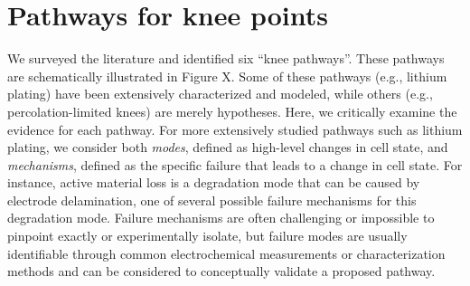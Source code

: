 \documentclass[journal=jpcl, manuscript=article, layout=onecolumn]{achemso}
\begin{document}
    
    




\section{Pathways for knee points}

We surveyed the literature and identified six ``knee pathways''. These pathways are schematically illustrated in Figure X. Some of these pathways (e.g., lithium plating) have been extensively characterized and modeled, while others (e.g., percolation-limited knees) are merely hypotheses. Here, we critically examine the evidence for each pathway. For more extensively studied pathways such as lithium plating, we consider both \textit{modes}, defined as high-level changes in cell state, and \textit{mechanisms}, defined as the specific failure that leads to a change in cell state. For instance, active material loss is a degradation mode that can be caused by electrode delamination, one of several possible failure mechanisms for this degradation mode. Failure mechanisms are often challenging or impossible to pinpoint exactly or experimentally isolate, but failure modes are usually identifiable through common electrochemical measurements or characterization methods and can be considered to conceptually validate a proposed pathway.
\end{document}

